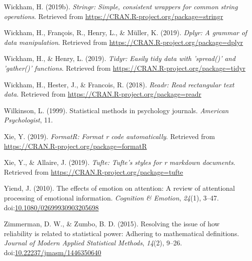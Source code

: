 \documentclass[english,,man,floatsintext]{apa6}
\begin{document}
\leavevmode\hypertarget{ref-R-stringr}{}%
Wickham, H. (2019b). \emph{Stringr: Simple, consistent wrappers for common string operations}. Retrieved from \url{https://CRAN.R-project.org/package=stringr}

\leavevmode\hypertarget{ref-R-dplyr}{}%
Wickham, H., François, R., Henry, L., \& Müller, K. (2019). \emph{Dplyr: A grammar of data manipulation}. Retrieved from \url{https://CRAN.R-project.org/package=dplyr}

\leavevmode\hypertarget{ref-R-tidyr}{}%
Wickham, H., \& Henry, L. (2019). \emph{Tidyr: Easily tidy data with 'spread()' and 'gather()' functions}. Retrieved from \url{https://CRAN.R-project.org/package=tidyr}

\leavevmode\hypertarget{ref-R-readr}{}%
Wickham, H., Hester, J., \& Francois, R. (2018). \emph{Readr: Read rectangular text data}. Retrieved from \url{https://CRAN.R-project.org/package=readr}

\leavevmode\hypertarget{ref-wilkinson_statistical_1999}{}%
Wilkinson, L. (1999). Statistical methods in psychology journals. \emph{American Psychologist}, 11.

\leavevmode\hypertarget{ref-R-formatR}{}%
Xie, Y. (2019). \emph{FormatR: Format r code automatically}. Retrieved from \url{https://CRAN.R-project.org/package=formatR}

\leavevmode\hypertarget{ref-R-tufte}{}%
Xie, Y., \& Allaire, J. (2019). \emph{Tufte: Tufte's styles for r markdown documents}. Retrieved from \url{https://CRAN.R-project.org/package=tufte}

\leavevmode\hypertarget{ref-yiend_effects_2010}{}%
Yiend, J. (2010). The effects of emotion on attention: A review of attentional processing of emotional information. \emph{Cognition \& Emotion}, \emph{24}(1), 3--47. doi:\href{https://doi.org/10.1080/02699930903205698}{10.1080/02699930903205698}

\leavevmode\hypertarget{ref-zimmerman_resolving_2015}{}%
Zimmerman, D. W., \& Zumbo, B. D. (2015). Resolving the issue of how reliability is related to statistical power: Adhering to mathematical definitions. \emph{Journal of Modern Applied Statistical Methods}, \emph{14}(2), 9--26. doi:\href{https://doi.org/10.22237/jmasm/1446350640}{10.22237/jmasm/1446350640}
\end{document}
